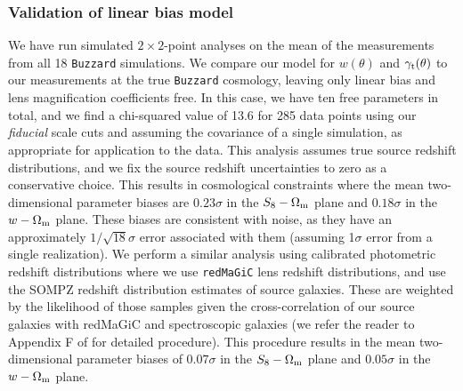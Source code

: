 \documentclass[aps, prd,twocolumn,superscriptaddress,nofootinbib,preprintnumbers]{revtex4-1}
\newcommand{\redmagic}{\texttt{redMaGiC} }
\newcommand{\buzzard}{\texttt{Buzzard} }
\newcommand{\SP}[1]{{\color{orange}[SP: #1]}}
\newcommand{\gary}[1]{\textcolor{red}{#1}}
\begin{document}
\subsubsection{Validation of linear bias model}
We have run simulated $2\times 2$-point analyses on the mean of the measurements from all 18 \buzzard simulations. We compare our model for $w(\theta)$ and $\gamma_{\rm t}(\theta)$ to our measurements at the true \buzzard cosmology, leaving only linear bias and lens magnification coefficients free. In this case, we have ten free parameters in total, and we find a chi-squared value of 13.6 for 285 data points using our \textit{fiducial} scale cuts and assuming the covariance of a single simulation, as appropriate for application to the data. This analysis assumes true source redshift distributions, and we fix the source redshift uncertainties to zero as a conservative choice. This results in cosmological constraints where the mean two-dimensional parameter biases are $0.23\sigma$ in the $S_8-\Omega_{\rm m}$ plane and $0.18\sigma$ in the $w-\Omega_{\rm m}$ plane. These biases are consistent with noise, as they have an approximately $1/\sqrt{18}\sigma$ error associated with them (assuming 1$\sigma$ error from a single realization). We perform a similar analysis using calibrated photometric redshift distributions where we use \redmagic lens redshift distributions, and use the SOMPZ redshift distribution estimates of source galaxies. These are weighted by the likelihood of those samples given the cross-correlation of our source galaxies with redMaGiC and spectroscopic galaxies (we refer the reader to Appendix F of \citet{y3-simvalidation} for detailed procedure). This procedure results in the mean two-dimensional parameter biases of $0.07\sigma$ in the $S_8-\Omega_{\rm m}$ plane and $0.05\sigma$ in the $w-\Omega_{\rm m}$ plane.
\end{document}
